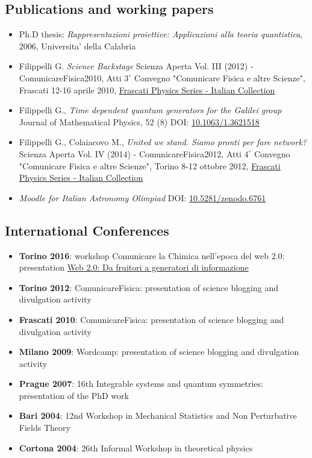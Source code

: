 \subsection*{Publications and working papers}
 \begin{itemize}
  \item Ph.D thesis: {\em Rappresentazioni proiettive: Applicazioni alla teoria quantistica}, 2006, Universita' della Calabria
  \item Filippelli G. {\em Science Backstage} Scienza Aperta Vol. III (2012) - ComunicareFisica2010, Atti $3^\circ$ Convegno "Comunicare Fisica e altre Scienze", Frascati 12-16 aprile 2010, \href{http://www.lnf.infn.it/sis/frascatiseries/italiancollection/index_ita.php}{Frascati Physics Series - Italian Collection}
  \item Filippelli G., {\em Time dependent quantum generators for the Galilei group} Journal of Mathematical Physics, 52 (8) DOI: \href{http://dx.doi.org/10.1063/1.3621518}{10.1063/1.3621518}
  \item Filippelli G., Colaiacovo M., {\em United we stand. Siamo pronti per fare network?} Scienza Aperta Vol. IV (2014) - ComunicareFisica2012, Atti $4^\circ$ Convegno "Comunicare Fisica e altre Scienze", Torino 8-12 ottobre 2012, \href{http://www.lnf.infn.it/sis/frascatiseries/italiancollection/index_ita.php}{Frascati Physics Series - Italian Collection}
  \item {\em Moodle for Italian Astronomy Olimpiad} DOI: \href{http://dx.doi.org/10.5281/zenodo.6761}{10.5281/zenodo.6761}
  \end{itemize}
\subsection*{International Conferences}
 \begin{itemize}
  \item {\bf Torino 2016}: workshop Comunicare la Chimica nell'epoca del web 2.0: presentation \href{http://dropseaofulaula.blogspot.it/2016/09/web-20-da-fruitori-generatori-di.html}{Web 2.0: Da fruitori a generatori di informazione}
  \item {\bf Torino 2012}: ComunicareFisica: presentation of science blogging and divulgation activity
  \item {\bf Frascati 2010}: ComunicareFisica: presentation of science blogging and divulgation activity
  \item {\bf Milano 2009}: Wordcamp: presentation of science blogging and divulgation activity
  \item {\bf Prague 2007}: 16th Integrable systems and quantum symmetries: presentation of the PhD work
  \item {\bf Bari 2004}: 12nd Workshop in Mechanical Statistics and Non Perturbative Fields Theory
  \item {\bf Cortona 2004}: 26th Informal Workshop in theoretical physics
 \end{itemize}
